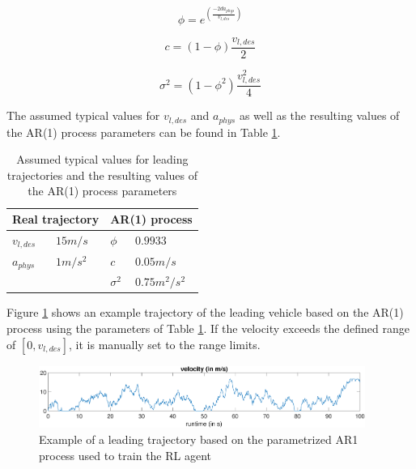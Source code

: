 \documentclass[review]{elsarticle}
\begin{document}
 \begin{equation}
\phi = e^{(\frac{-2da_{phys}}{v_{l,des}})}
\end{equation}

 \begin{equation}
c=(1-\phi)\frac{v_{l,des}}{2}
\end{equation}

 \begin{equation}
 \sigma^2=(1-\phi^2)\frac{v_{l,des}^2}{4}
\end{equation}

The assumed typical values for $v_{l,des}$ and  $a_{phys}$ as well as the resulting values of the AR(1) process parameters can be found in Table \ref{tab:AR1Parameters}.

\begin{table}
	\caption{Assumed typical values for leading trajectories and the resulting values of the AR(1) process parameters} 
	\label{tab:AR1Parameters} 
	\begin{center}
		\begin{tabular}{ p{} p{} |p{} p{}  }
			 \multicolumn{2}{c|}{Real trajectory} & \multicolumn{2}{c}{AR(1) process}   \\ \hline
			$v_{l,des}$ &$15m/s$ &$\phi$ & $0.9933$\\
			$a_{phys}$ &$1m/s^2$ &$c$ & $0.05m/s$\\
			& & $\sigma^2$ & $0.75m^2/s^2$
			
		\end{tabular}
	\end{center}
\end{table}

Figure \ref{fig:AR1process} shows an example trajectory of the leading vehicle based on the AR(1) process using the parameters of Table \ref{tab:AR1Parameters}. If the velocity exceeds the defined range of $[0, v_{l,des}]$, it is manually set to the range limits.
\begin{figure}
	\centering
	\includegraphics[width=0.95\textwidth]{images/AR1process}
	\caption{Example of a leading trajectory based on the parametrized AR1 process used to train the RL agent}
	\label{fig:AR1process}
\end{figure}
\end{document}
